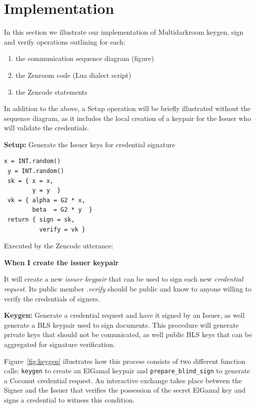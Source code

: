 \documentclass[twocolumn]{article}
\begin{document}
\section{Implementation}
\label{sec:implementation}

\lstset{basicstyle=\ttfamily\scriptsize, breaklines=true}

In this section we illustrate our implementation of Multidarkroom
keygen, sign and verify operations outlining for each:

\begin{enumerate}
  \item the communication sequence diagram (figure)
  \item the Zenroom code (Lua dialect script)
  \item the Zencode statements
\end{enumerate}

In addition to the above, a Setup operation will be briefly
illustrated without the sequence diagram, as it includes the local
creation of a keypair for the Issuer who will validate the
credentials.

\textbf{Setup:} Generate the Issuer keys for credential signature

\begin{lstlisting}[style=lua]
 x = INT.random()
 y = INT.random()
 sk = { x = x,
        y = y  }
 vk = { alpha = G2 * x,
        beta  = G2 * y  }
 return { sign = sk,
          verify = vk }
\end{lstlisting}

Executed by the Zencode utterance:

\textbf{When I create the issuer keypair}

It will create a new \emph{issuer keypair} that can be used to sign
each new \emph{credential request}. Its public member \emph{.verify}
should be public and know to anyone willing to verify the credentials
of signers.

\textbf{Keygen:} Generate a credential request and have it signed by
an Issuer, as well generate a BLS keypair used to sign documents. This
procedure will generate private keys that should not be comunicated,
as well public BLS keys that can be aggregated for signature
verification.

Figure~\ref{fig:keygen} illustrates how this process consists of two
different function calls: \verb!keygen! to create an ElGamal keypair
and \verb!prepare_blind_sign! to generate a Coconut credential
request. An interactive exchange takes place between the Signer and
the Issuer that verifies the possession of the secret ElGamal key and
signs a credential to witness this condition.
\end{document}
